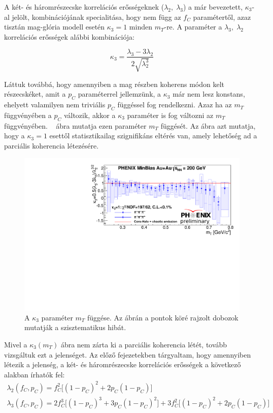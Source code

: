 \documentclass[11pt,a4paper]{article}
\numberwithin{equation}{subsection}
\numberwithin{figure}{section}
\begin{document}
A két- és háromrészecske korrelációs erősségeknek ($\lambda_2,\;\lambda_3$) a már bevezetett, $\kappa_3$-al jelölt, kombinációjának specialitása, hogy nem függ az $f_C$ paramétertől, azaz tisztán mag-glória modell esetén $\kappa_3=1$ minden $m_T$-re. A paraméter a $\lambda_3,\; \lambda_2$ korrelációs erősségek alábbi kombinációja:

\begin{equation}
\kappa_3 = \frac{\lambda_3-3\lambda_2}{2\sqrt{\lambda_2^3}}
\end{equation}

Láttuk továbbá, hogy amennyiben a mag részben koherens módon kelt részecskéket, amit a $p_C$ paraméterrel jellemzünk, a $\kappa_3$ már nem lesz konstans, ehelyett valamilyen nem triviális $p_C$ függéssel fog rendelkezni. Azaz ha az $m_T$ függvényében a $p_C$ változik, akkor a $\kappa_3$ paraméter is fog változni az $m_T$ függvényében. ~ ábra mutatja ezen paraméter $m_T$ függését. Az ábra azt mutatja, hogy a $\kappa_3=1$ esettől statisztikailag szignifikáns eltérés van, amely lehetőség ad a parciális koherencia létezésére.

\begin{figure}[H]
\centering
\includegraphics[scale=0.75]{pic/res/kappa3.pdf}
\caption{A $\kappa_3$ paraméter $m_T$ függése. Az ábrán a pontok köré rajzolt dobozok mutatják a szisztematikus hibát.}
\label{fig:kappa3}
\end{figure}

Mivel a $\kappa_3(m_T)$ ábra nem zárta ki a parciális koherencia létét, tovább vizsgáltuk ezt a jelenséget. Az előző fejezetekben tárgyaltam, hogy amennyiben létezik a jelenség, a két- és háromrészecske korrelációs erősségek a következő alakban írhatók fel:
\begin{equation}
\begin{aligned}
\lambda_2(f_C, p_C) =  f_C^2\big[(1-p_C)^2+2p_C(1-p_C)\big]\\
\lambda_3(f_C, p_C) =  2f_C^3\big[(1-p_C)^3+3p_C(1-p_C)^2\big]+3f_C^2\big[(1-p_C)^2+2p_C(1-p_C)\big]
\end{aligned}
\label{eq:l2l3}
\end{equation}
\end{document}
